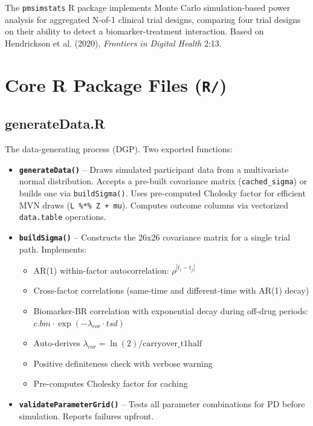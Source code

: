 \documentclass[11pt]{article}
\begin{document}
\maketitle
\thispagestyle{fancy}
\tableofcontents

The \texttt{pmsimstats} R package implements Monte Carlo
simulation-based power analysis for aggregated N-of-1
clinical trial designs, comparing four trial designs on their
ability to detect a biomarker-treatment interaction. Based on
Hendrickson et al. (2020), \textit{Frontiers in Digital Health} 2:13.

\section{Core R Package Files (\texttt{R/})}

\subsection{generateData.R}

The data-generating process (DGP). Two exported functions:

\begin{itemize}
  \item \textbf{\texttt{generateData()}} -- Draws simulated participant data
    from a multivariate normal distribution. Accepts a
    pre-built covariance matrix (\texttt{cached\_sigma}) or builds
    one via \texttt{buildSigma()}. Uses pre-computed Cholesky factor
    for efficient MVN draws (\texttt{L \%*\% Z + mu}). Computes
    outcome columns via vectorized \texttt{data.table} operations.

  \item \textbf{\texttt{buildSigma()}} -- Constructs the 26x26 covariance
    matrix for a single trial path. Implements:
    \begin{itemize}
      \item AR(1) within-factor autocorrelation: $\rho^{|t_i - t_j|}$
      \item Cross-factor correlations (same-time and different-time
        with AR(1) decay)
      \item Biomarker-BR correlation with exponential decay during
        off-drug periods: $c.bm \cdot \exp(-\lambda_{cor} \cdot tsd)$
      \item Auto-derives $\lambda_{cor} = \ln(2) / \text{carryover\_t1half}$
      \item Positive definiteness check with verbose warning
      \item Pre-computes Cholesky factor for caching
    \end{itemize}

  \item \textbf{\texttt{validateParameterGrid()}} -- Tests all parameter
    combinations for PD before simulation. Reports failures
    upfront.
\end{itemize}
\end{document}
